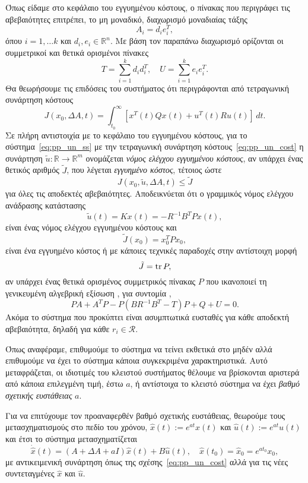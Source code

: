 Όπως είδαμε στο κεφάλαιο του εγγυημένου κόστους, ο πίνακας που περιγράφει τις
αβεβαιότητες επιτρέπει, το μη μοναδικό, διαχωρισμό μοναδιαίας τάξης
\[
    A_i = d_ie_i^T,
\]
όπου \( i = 1, \dots k \) και \( d_i, e_i \in \mathbb{R}^n \). Με βάση τον
παραπάνω διαχωρισμό ορίζονται οι συμμετρικοί και θετικά ορισμένοι
πίνακες
\[
   T = \sum_{i = 1}^k d_id_i^T, \quad
   U = \sum_{i = 1}^k e_ie_i^T.
\]
Θα θεωρήσουμε τις επιδόσεις του συστήματος ότι περιγράφονται από τετραγωνική
συνάρτηση κόστους
\begin{equation}\label{eq:pp_un_cost}
    J(x_0, \Delta A, t) = \int_{t_0}^{\infty}
    \left[ x^T(t)Qx(t) + u^T(t)Ru(t) \right] \, dt.
\end{equation}
Σε πλήρη αντιστοιχία με το κεφάλαιο του εγγυημένου κόστους, για το σύστημα~\eqref{eq:pp_un_ss}
με την τετραγωνική συνάρτηση κόστους~\eqref{eq:pp_un_cost} η συνάρτηση
\( \tilde{u}:\mathbb{R} \to \mathbb{R}^m \) ονομάζεται \emph{νόμος ελέγχου εγγυημένου κόστους},
αν υπάρχει ένας θετικός αριθμός \( \tilde{J} \), που λέγεται \emph{εγγυημένο κόστος}, τέτοιος ώστε
\[
    J(x_0, \tilde{u}, \Delta A, t) \leq \tilde{J}
\]
για όλες τις αποδεκτές αβεβαιότητες. Αποδεικνύεται ότι ο γραμμικός νόμος ελέγχου
ανάδρασης κατάστασης
\[
    \tilde{u}(t) = Kx(t) = - R^{-1}B^{T}Px(t),
\]
είναι ένας νόμος ελέγχου εγγυημένου κόστους και
\[
    \tilde{J}(x_0) = x_0^{T}Px_0,
\]
είναι ένα εγγυημένο κόστος ή με κάποιες τεχνικές παραδοχές στην αντίστοιχη μορφή
\begin{equation}\label{eq:pp_un_gcc_J}
    \tilde{J} = \operatorname{tr}{P},
\end{equation}
αν υπάρχει ένας θετικά ορισμένος συμμετρικός πίνακας
\( P \) που ικανοποιεί τη γενικευμένη αλγεβρική εξίσωση , για
συντομία ,
\begin{equation}\label{eq:pp_un_gare_general}
    PA + A^{T}P - P(BR^{-1}B^{T} - T)P + Q + U = 0.
\end{equation}
Ακόμα το σύστημα που προκύπτει είναι ασυμπτωτικά ευσταθές για κάθε αποδεκτή
αβεβαιότητα, δηλαδή για κάθε \( r_i \in \mathcal{R} \).

Όπως αναφέραμε, επιθυμούμε το σύστημα να τείνει εκθετικά στο μηδέν αλλά
επιθυμούμε να έχει το σύστημα κάποια συγκεκριμένα χαρακτηριστικά. Αυτό
μεταφράζεται, οι ιδιοτιμές του κλειστού συστήματος θέλουμε να βρίσκονται
αριστερά από κάποια επιλεγμένη τιμή, έστω \( a \), ή αντίστοιχα το κλειστό
σύστημα να έχει \emph{βαθμό σχετικής ευστάθειας} \( a \).

Για να επιτύχουμε τον προαναφερθέν βαθμό σχετικής ευστάθειας, θεωρούμε τους
μετασχηματισμούς στο πεδίο του χρόνου, \( \hat{x}(t) := e^{at}x(t) \)
και \( \hat{u}(t) := e^{at}u(t) \) και έτσι το σύστημα μετασχηματίζεται
\begin{equation}\label{eq:pp_un_a}
    \dot{\hat{x}}(t) = (A + \Delta A + aI)\hat{x}(t) + B\hat{u}(t), \quad
    \hat{x}(t_0) = \hat{x}_0 = e^{at_0}x_0,
\end{equation}
με αντικειμενική συνάρτηση όπως της σχέσης~\eqref{eq:pp_un_cost} αλλά για τις
νέες συντεταγμένες \( \hat{x} \) και \( \hat{u} \).


